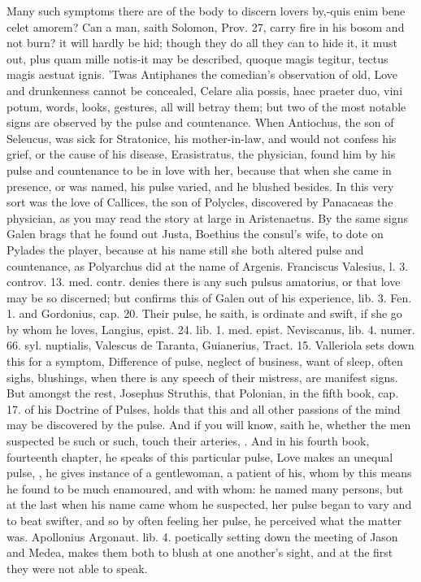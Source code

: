 Many such symptoms there are of the body to discern lovers by,-quis
enim bene celet amorem? Can a man, saith Solomon, Prov.  27, carry
fire in his bosom and not burn? it will hardly be hid; though they do
all they can to hide it, it must out, plus quam mille notis-it may be
described, quoque magis tegitur, tectus magis aestuat ignis.
'Twas Antiphanes the comedian's observation of old, Love and
drunkenness cannot be concealed, Celare alia possis, haec praeter duo,
vini potum, \etc{} words, looks, gestures, all will betray them; but two
of the most notable signs are observed by the pulse and countenance.
When Antiochus, the son of Seleucus, was sick for Stratonice, his
mother-in-law, and would not confess his grief, or the cause of his
disease, Erasistratus, the physician, found him by his pulse and
countenance to be in love with her, because that when she came in
presence, or was named, his pulse varied, and he blushed besides. In
this very sort was the love of Callices, the son of Polycles,
discovered by Panacaeas the physician, as you may read the story at
large in Aristenaetus. By the same signs Galen brags that he
found out Justa, Boethius the consul's wife, to dote on Pylades the
player, because at his name still she both altered pulse and
countenance, as  Polyarchus did at the name of Argenis.
Franciscus Valesius, l. 3. controv. 13. med. contr. denies there is any
such pulsus amatorius, or that love may be so discerned; but \Avicenna{}
confirms this of Galen out of his experience, lib. 3. Fen. 1. and
Gordonius, cap. 20. Their pulse, he saith, is ordinate and swift,
if she go by whom he loves, Langius, epist. 24. lib. 1. med. epist.
Neviscanus, lib. 4. numer. 66. syl. nuptialis, Valescus de Taranta,
Guianerius, Tract. 15. Valleriola sets down this for a symptom,
Difference of pulse, neglect of business, want of sleep, often
sighs, blushings, when there is any speech of their mistress, are
manifest signs. But amongst the rest, Josephus Struthis, that Polonian,
in the fifth book, cap. 17. of his Doctrine of Pulses, holds that this
and all other passions of the mind may be discovered by the pulse.
And if you will know, saith he, whether the men suspected be such
or such, touch their arteries, \etc{}. And in his fourth book, fourteenth
chapter, he speaks of this particular pulse,  Love makes an
unequal pulse, \etc{}, he gives instance of a gentlewoman, a patient
of his, whom by this means he found to be much enamoured, and with
whom: he named many persons, but at the last when his name came whom he
suspected, her pulse began to vary and to beat swifter, and so by
often feeling her pulse, he perceived what the matter was. Apollonius
Argonaut. lib. 4. poetically setting down the meeting of Jason and
Medea, makes them both to blush at one another's sight, and at the
first they were not able to speak.

